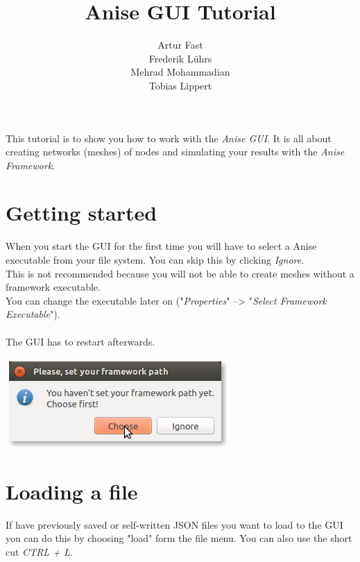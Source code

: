 \documentclass[12pt, accentcolor=tud1b]{tudreport}
\title{\textbf{Anise GUI Tutorial}}
\subtitle{Artur Fast \\ Frederik L\"uhrs \\ Mehrad Mohammadian \\ Tobias Lippert}
\begin{document}
\maketitle
\noindent
This tutorial is to show you how to work with the \emph{Anise GUI}. It is all about creating networks
(meshes) of nodes and simulating your results with the \emph{Anise Framework}.

\section*{Getting started}
\begin{minipage}{0.5\textwidth}
When you start the GUI for the first time you will
have to select a Anise executable from your file
system. You can skip this by clicking \emph{Ignore}.\\
This is not recommended because you will not be
able to create meshes without a framework
executable. \\
You can change the executable later on ("\emph{Properties}"  --\textgreater{} "\emph{Select Framework Executable}"). \\ \\
The GUI has to restart afterwards.
\end{minipage}
\begin{minipage}{0.5\textwidth}
\includegraphics[width=\textwidth]{choose_path}
\end{minipage}

\section*{Loading a file}
If have previously saved or self-written JSON files you want to load to the GUI you can do this by choosing "load" form the file menu. You can also use the short cut \emph{CTRL + L}.
\end{document}

